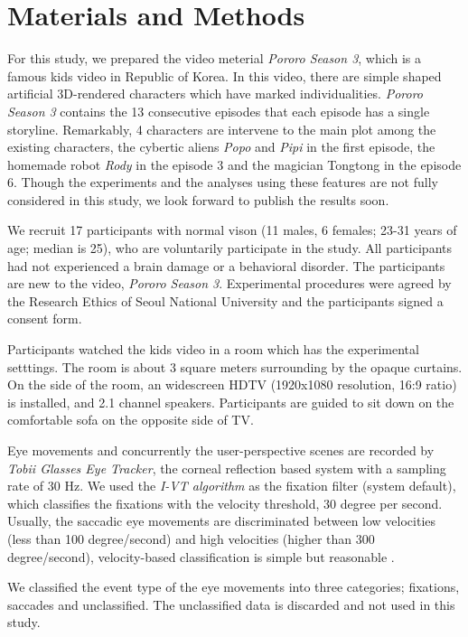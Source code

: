 \documentclass[10pt,letterpaper]{article}
\begin{document}
\section{Materials and Methods}

For this study, we prepared the video meterial \textit{Pororo Season 3}, which is a famous kids video in Republic of Korea. In this video, there are simple shaped artificial 3D-rendered characters which have marked individualities. \textit{Pororo Season 3} contains the 13 consecutive episodes that each episode has a single storyline. Remarkably, 4 characters are intervene to the main plot among the existing characters, the cybertic aliens \textit{Popo} and \textit{Pipi} in the first episode, the homemade robot \textit{Rody} in the episode 3 and the magician Tongtong in the episode 6. Though the experiments and the analyses using these features are not fully considered in this study, we look forward to publish the results soon. 

We recruit 17 participants with normal vison (11 males, 6 females; 23-31 years of age; median is 25), who are voluntarily participate in the study. All participants had not experienced a brain damage or a behavioral disorder. The participants are new to the video, \textit{Pororo Season 3}. Experimental procedures were agreed by the Research Ethics of Seoul National University and the participants signed a consent form.

Participants watched the kids video in a room which has the experimental setttings. The room is about 3 square meters surrounding by the opaque curtains. On the side of the room, an widescreen HDTV (1920x1080 resolution, 16:9 ratio) is installed, and 2.1 channel speakers. Participants are guided to sit down on the comfortable sofa on the opposite side of TV.

Eye movements and concurrently the user-perspective scenes are recorded by \textit{Tobii Glasses Eye Tracker}, the corneal reflection based system with a sampling rate of 30 Hz. We used the \textit{I-VT algorithm} as the fixation filter (system default), which classifies the fixations with the velocity threshold, 30 degree per second. Usually, the saccadic eye movements are discriminated between low velocities (less than 100 degree/second) and high velocities (higher than 300 degree/second), velocity-based classification is simple but reasonable \cite{Salvucci2000}.

We classified the event type of the eye movements into three categories; fixations, saccades and unclassified. The unclassified data is discarded and not used in this study.
\end{document}
